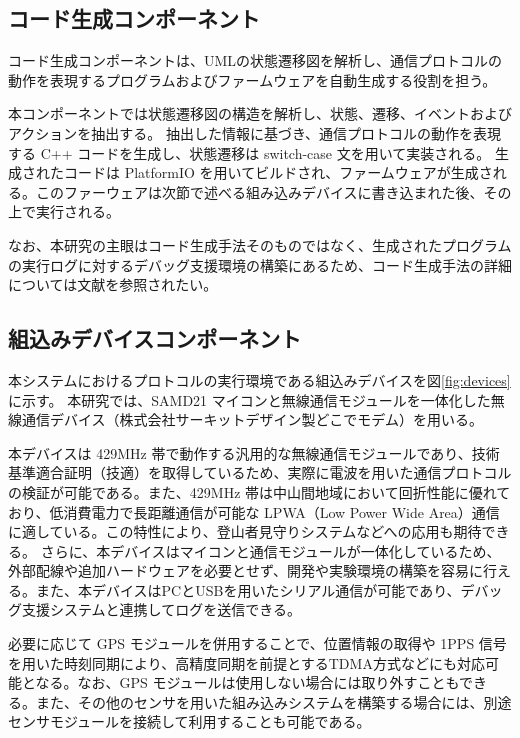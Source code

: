 \documentclass[12pt]{jreport}
\begin{document}
\subsection{コード生成コンポーネント}
\begin{par}
コード生成コンポーネントは、UMLの状態遷移図を解析し、通信プロトコルの動作を表現するプログラムおよびファームウェアを自動生成する役割を担う。
\end{par}
\begin{par}
本コンポーネントでは状態遷移図の構造を解析し、状態、遷移、イベントおよびアクションを抽出する。
抽出した情報に基づき、通信プロトコルの動作を表現する C++ コードを生成し、状態遷移は switch-case 文を用いて実装される。
生成されたコードは PlatformIO を用いてビルドされ、ファームウェアが生成される。このファーウェアは次節で述べる組み込みデバイスに書き込まれた後、その上で実行される。
\end{par}
\begin{par}
なお、本研究の主眼はコード生成手法そのものではなく、生成されたプログラムの実行ログに対するデバッグ支援環境の構築にあるため、コード生成手法の詳細については文献\cite{yu-kobayashi}を参照されたい。
\end{par}

\subsection{組込みデバイスコンポーネント}
\begin{par}
本システムにおけるプロトコルの実行環境である組込みデバイスを図\ref{fig:devices}に示す。
本研究では、SAMD21 マイコンと無線通信モジュールを一体化した無線通信デバイス（株式会社サーキットデザイン製どこでモデム）を用いる。
\end{par}
\begin{par}
本デバイスは 429MHz 帯で動作する汎用的な無線通信モジュールであり、技術基準適合証明（技適）を取得しているため、実際に電波を用いた通信プロトコルの検証が可能である。また、429MHz 帯は中山間地域において回折性能に優れており、低消費電力で長距離通信が可能な LPWA（Low Power Wide Area）通信に適している。この特性により、登山者見守りシステムなどへの応用も期待できる。
さらに、本デバイスはマイコンと通信モジュールが一体化しているため、外部配線や追加ハードウェアを必要とせず、開発や実験環境の構築を容易に行える。また、本デバイスはPCとUSBを用いたシリアル通信が可能であり、デバッグ支援システムと連携してログを送信できる。
\end{par}

\begin{par}
必要に応じて GPS モジュールを併用することで、位置情報の取得や 1PPS 信号を用いた時刻同期により、高精度同期を前提とするTDMA方式などにも対応可能となる。なお、GPS モジュールは使用しない場合には取り外すこともできる。また、その他のセンサを用いた組み込みシステムを構築する場合には、別途センサモジュールを接続して利用することも可能である。
\end{par}
\end{document}
